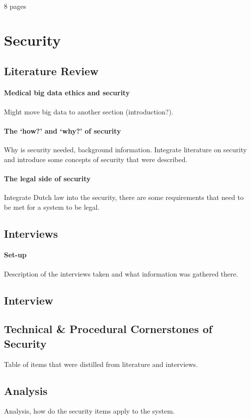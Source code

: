 \newline

8 pages

\section{Security}
\subsection{Literature Review}
\paragraph{Medical big data ethics and security}
Might move big data to another section (introduction?).

\paragraph{The `how?' and `why?' of security}

Why is security needed, background information.	
Integrate literature on security and introduce some concepts of security that were described.

\paragraph{The legal side of security}
Integrate Dutch law into the security, there are some requirements that need to be met for a system to be legal.

\subsection{Interviews}
\paragraph{Set-up}
Description of the interviews taken and what information was gathered there.

\subsection{Interview}

\subsection{Technical \& Procedural Cornerstones of Security}
Table of items that were distilled from literature and interviews.

\subsection{Analysis}
Analysis, how do the security items apply to the system.